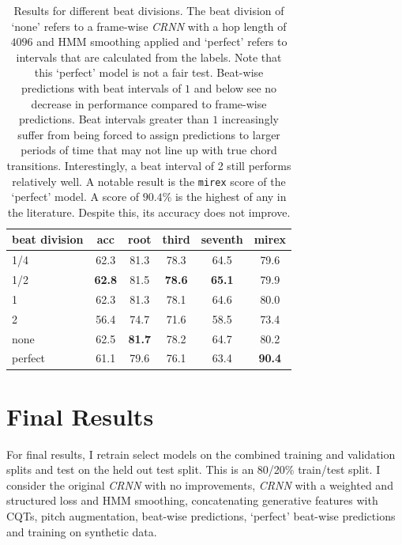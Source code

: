 \begin{table}[H]
    \centering
    \begin{tabular}{lccccc}
        \toprule
        beat division & acc & root & third & seventh & mirex \\  
        \midrule
        1/4                 & 62.3           & 81.3          & 78.3          & 64.5           & 79.6         \\
        1/2                 & \textbf{62.8}  & 81.5          & \textbf{78.6} & \textbf{65.1}  & 79.9         \\
        1                   & 62.3           & 81.3          & 78.1          & 64.6           & 80.0         \\
        2  & 56.4           & 74.7          & 71.6          & 58.5           & 73.4         \\
        none                & 62.5           & \textbf{81.7} & 78.2          & 64.7           & 80.2         \\
        perfect             & 61.1           & 79.6          & 76.1          & 63.4           & \textbf{90.4}\\
        \bottomrule
    \end{tabular}
    \caption{Results for different beat divisions. The beat division of `none' refers to a frame-wise \emph{CRNN} with a hop length of $4096$ and HMM smoothing applied and `perfect' refers to intervals that are calculated from the labels. Note that this `perfect' model is not a fair test. Beat-wise predictions with beat intervals of $1$ and below see no decrease in performance compared to frame-wise predictions. Beat intervals greater than $1$ increasingly suffer from being forced to assign predictions to larger periods of time that may not line up with true chord transitions. Interestingly, a beat interval of 2 still performs relatively well. A notable result is the \texttt{mirex} score of the `perfect' model. A score of $90.4\%$ is the highest of any in the literature. Despite this, its accuracy does not improve. }\label{tab:beat_division}
\end{table}


\section{Final Results}\label{sec:test-set}

For final results, I retrain select models on the combined training and validation splits and test on the held out test split. This is an 80/20\% train/test split. I consider the original \emph{CRNN} with no improvements, \emph{CRNN} with a weighted and structured loss and HMM smoothing, concatenating generative features with CQTs, pitch augmentation, beat-wise predictions, `perfect' beat-wise predictions and training on synthetic data. 

